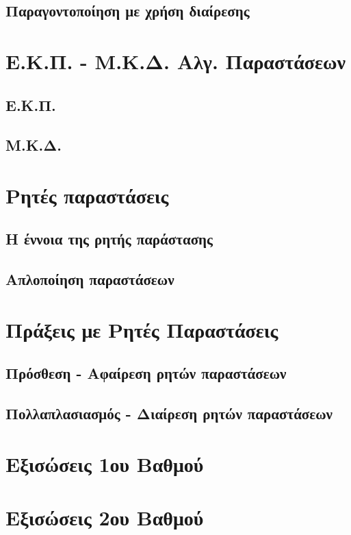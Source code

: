 \documentclass[twoside,10pt]{book}
\begin{document}
\section{Παραγοντοποίηση με χρήση διαίρεσης}
\chapter{Ε.Κ.Π. - Μ.Κ.Δ. Αλγ. Παραστάσεων}
\section{Ε.Κ.Π.}
\section{Μ.Κ.Δ.}
\chapter{Ρητές παραστάσεις}
\section{Η έννοια της ρητής παράστασης}
\section{Απλοποίηση παραστάσεων}
\chapter{Πράξεις με Ρητές Παραστάσεις}
\section{Πρόσθεση - Αφαίρεση ρητών παραστάσεων}
\section{Πολλαπλασιασμός - Διαίρεση ρητών παραστάσεων}
\chapter{Εξισώσεις 1ου Βαθμού}
\chapter{Εξισώσεις 2ου Βαθμού}
\end{document}
